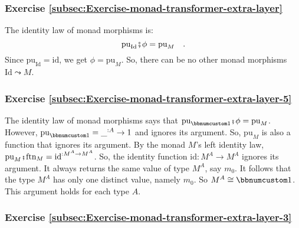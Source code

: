 
\subsubsection*{Exercise \ref{subsec:Exercise-monad-transformer-extra-layer}}

The identity law of monad morphisms is:
\[
\text{pu}_{\text{Id}}\bef\phi=\text{pu}_{M}\quad.
\]
Since $\text{pu}_{\text{Id}}=\text{id}$, we get $\phi=\text{pu}_{M}$.
So, there can be no other monad morphisms $\text{Id}\leadsto M$.

\subsubsection*{Exercise \ref{subsec:Exercise-monad-transformer-extra-layer-5}}

The identity law of monad morphisms says that $\text{pu}_{\bbnum 1}\bef\phi=\text{pu}_{M}$.
However, $\text{pu}_{\bbnum 1}=\_^{:A}\rightarrow1$ and ignores its
argument. So, $\text{pu}_{M}$ is also a function that ignores its
argument. By the monad $M$\textsf{'}s left identity law, $\text{pu}_{M}\bef\text{ftn}_{M}=\text{id}^{:M^{A}\rightarrow M^{A}}$.
So, the identity function $\text{id}:M^{A}\rightarrow M^{A}$ ignores
its argument. It always returns the same value of type $M^{A}$, say
$m_{0}$. It follows that the type $M^{A}$ has only one distinct
value, namely $m_{0}$. So $M^{A}\cong\bbnum 1$. This argument holds
for each type $A$. 

\subsubsection*{Exercise \ref{subsec:Exercise-monad-transformer-extra-layer-3}}

